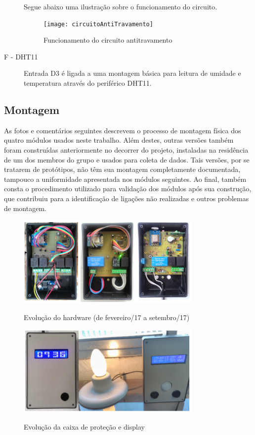 \begin{description}
Segue abaixo uma ilustração sobre o funcionamento do circuito.

\begin{figure}[H]
	\centering
	\caption{Funcionamento do circuito antitravamento}
  \texttt{[image: circuitoAntiTravamento]}
\label{fig:circuitoAntiTravamento}
\end{figure}

\item [F - DHT11] Entrada D3 é ligada a uma montagem básica para leitura de umidade e temperatura através do periférico DHT11.

\end{description}

\subsection {Montagem}

As fotos e comentários seguintes descrevem o processo de montagem física dos quatro módulos usados neste trabalho. Além destes, outras versões também foram construídas anteriormente no decorrer do projeto, instaladas na residência de um dos membros do grupo e usados para coleta de dados. Tais versões, por se tratarem de protótipos, não têm sua montagem completamente documentada, tampouco a uniformidade apresentada nos módulos seguintes.
Ao final, também consta o procedimento utilizado para validação dos módulos após sua construção, que contribuiu para a identificação de ligações não realizadas e outros problemas de montagem.

\begin{figure}[H]
	\centering
	\caption{Evolução do hardware (de fevereiro/17 a setembro/17)}
	\includegraphics[width=0.8\textwidth]{evolHW}
	\label{fig:evolHW}
\end{figure}

\begin{figure}[H]
	\centering
	\caption{Evolução da caixa de proteção e display}
	\includegraphics[width=0.8\textwidth]{evolProtDisplay}
	\label{fig:evolProtDisplay}
\end{figure}

